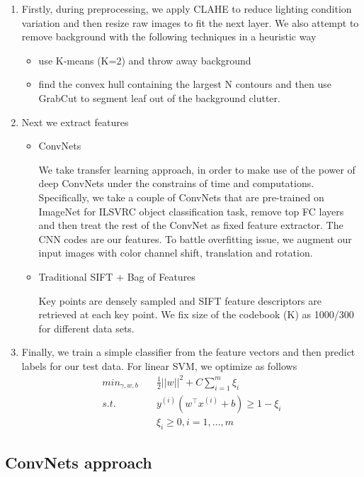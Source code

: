 \documentclass[journal, 10pt]{IEEEtran}
\newcommand*{\tran}{^{\intercal}}
\begin{document}
\begin{enumerate}
  \item Firstly, during preprocessing, we apply CLAHE\cite{CLAHE} to reduce lighting condition variation and then resize raw images to fit the next layer. We also attempt to remove background with the following techniques in a heuristic way
  \begin{itemize}
    \item use K-means (K=2) and throw away background
    \item find the convex hull containing the largest N contours and then use GrabCut\cite{Grabcut} to segment leaf out of the background clutter.
  \end{itemize}
\item Next we extract features
\begin{itemize}
  \item ConvNets

    We take transfer learning approach, in order to make use of the power of deep ConvNets under the constrains of time and computations. Specifically, we take a couple of ConvNets that are pre-trained on ImageNet for ILSVRC object classification task, remove top FC layers and then treat the rest of the ConvNet as fixed feature extractor. The CNN codes are our features. To battle overfitting issue, we augment our input images with color channel shift, translation and rotation.
  \item Traditional SIFT + Bag of Features

    Key points are densely sampled and SIFT feature descriptors are retrieved at each key point. We fix size of the codebook (K) as 1000/300 for different data sets.
\end{itemize}
\item Finally,  we train a simple classifier from the feature vectors and then predict labels for our test data. For linear SVM, we optimize as follows
  \begin{align*}
    min_{\gamma, w, b}\quad &\frac{1}{2} || w || ^2 + C \sum_{i=1}^m \xi_i \\
    s.t.\quad & y^{(i)} ( w\tran x^{(i)} + b ) \geq 1 - \xi_i \\
         & \xi_i \geq 0, i = 1, \dots, m
  \end{align*}
\end{enumerate}
\subsection{ConvNets approach}
\end{document}
